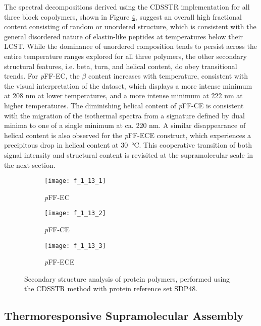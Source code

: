 \begin{refsection}
The spectral decompositions derived using the CDSSTR implementation for all
three block copolymers, shown in Figure \ref{fig:CD_computation}, suggest an
overall high fractional content consisting of random or unordered structure,
which is consistent with the general disordered nature of elastin-like peptides
at temperatures below their LCST.  While the dominance of unordered composition
tends to persist across the entire temperature ranges explored for all three
polymers, the other secondary structural features, i.e. beta, turn, and helical
content, do obey transitional trends. For \emph{p}FF-EC, the ${\beta}$ content
increases with temperature, consistent with the visual interpretation of the
dataset, which displays a more intense minimum at 208 nm at lower temperatures,
and a more intense minimum at 222 nm at higher temperatures. The diminishing
helical content of \emph{p}FF-CE is consistent with the migration of the
isothermal spectra from a signature defined by dual minima to one of a single
minimum at ca. 220 nm. A similar disappearance of helical content is also
observed for the \emph{p}FF-ECE construct, which experiences a precipitous drop
in helical content at \SI{30}{\celsius}. This cooperative transition of both
signal intensity and structural content is revisited at the supramolecular scale
in the next section.

\begin{figure}[h!]
    \centering
    \begin{subfigure}[b]{0.32\textwidth}
        \centering
        \texttt{[image: f\_1\_13\_1]}
        \caption{\emph{p}FF-EC}
        \label{fig:CDcomp_ECpFF}
    \end{subfigure}
    \begin{subfigure}[b]{0.32\textwidth}
        \centering
        \texttt{[image: f\_1\_13\_2]}
        \caption{\emph{p}FF-CE}
        \label{fig:CDcomp_CEpFF}
    \end{subfigure}
    \begin{subfigure}[b]{0.32\textwidth}
        \centering
        \texttt{[image: f\_1\_13\_3]}
        \caption{\emph{p}FF-ECE}
        \label{fig:CDcomp_ECEpFF}
    \end{subfigure}
    \caption{Secondary structure analysis of protein polymers, performed using
    the CDSSTR method with protein reference set SDP48.}\label{fig:CD_computation}
\end{figure}
\subsection{Thermoresponsive Supramolecular Assembly}


\end{refsection}
